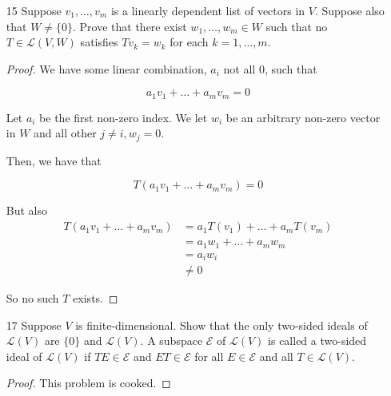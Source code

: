 \begin{enumerate}
\begin{proof}
    Suppose there was some $u \in U$ where $Su \neq 0$. Then, we have some $v \in V, v \notin U$. $u + v \notin U$, so $T(u + v) = 0$. But also $T(u + v) = Tu + Tv = Tu \neq 0$. Contradiction!
\end{proof}

\item[15] Suppose $v_1,\dots,v_m$ is a linearly dependent list of vectors in $V$. Suppose
also that $W\neq\{0\}$. Prove that there exist $w_1,\dots,w_m\in W$ such that no
$T\in\mathcal L(V,W)$ satisfies $Tv_k=w_k$ for each $k=1,\dots,m$.

\begin{proof}
    We have some linear combination, $a_i$ not all 0, such that 

    $$a_1v_1 + \dots + a_mv_m = 0$$

    Let $a_i$ be the first non-zero index. We let $w_i$ be an arbitrary non-zero vector in $W$ and all other $j \neq i , w_j = 0$. 

    Then, we have that 

    $$T(a_1v_1 + \dots + a_mv_m) = 0$$ 

    But also 
    \begin{align*}
        T(a_1v_1 + \dots + a_mv_m) &= a_1T(v_1) + \dots + a_mT(v_m) \\
        &= a_1w_1 + \dots + a_mw_m \\
        &= a_iw_i \\
        &\neq 0
    \end{align*}

    So no such $T$ exists.
    
\end{proof}

\item[17] Suppose $V$ is finite-dimensional. Show that the only two-sided ideals of
$\mathcal{L}(V)$ are $\{0\}$ and $\mathcal{L}(V)$.
A subspace $\mathcal{E}$ of $\mathcal{L}(V)$ is called a two-sided ideal of $\mathcal{L}(V)$ if $TE \in \mathcal{E}$ and
$ET \in \mathcal{E}$ for all $E \in \mathcal{E}$ and all $T \in \mathcal{L}(V)$.

\begin{proof}
    This problem is cooked.
\end{proof}

\end{enumerate}